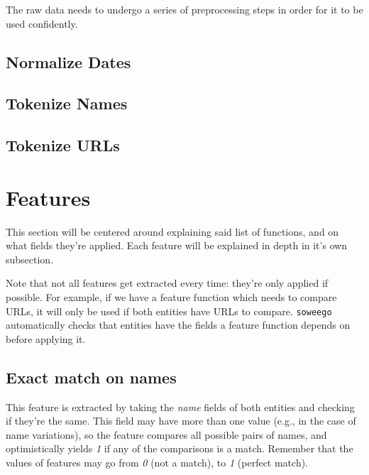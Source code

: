 \documentclass[epsfig,a4paper,11pt,titlepage,twoside,openany]{book}
\begin{document}

The raw data needs to undergo a series of preprocessing steps in order for it to be used confidently.



\subsection{Normalize Dates}
\label{sec:data-preprocessiong-date-normalization}

\subsection{Tokenize Names}
\label{sec:data-preprocessiong-name-tokenization}

\subsection{Tokenize URLs}
\label{sec:data-preprocessiong-URL-tokenization}



\section{Features}
\label{sec:used-features}

This section will be centered around explaining said list of functions, and on what fields they're applied. Each feature will be explained in depth in it's own subsection.

Note that not all features get extracted every time: they're only applied if possible. For example, if we have a feature function which needs to compare URLs, it will only be used if both entities have URLs to compare. \texttt{soweego} automatically checks that entities have the fields a feature function depends on before applying it.


\subsection{Exact match on names}
\label{sec:feature-exact-match-names}

This feature is extracted by taking the \textit{name} fields of both entities and checking if they're the same. This field may have more than one value (e.g., in the case of name variations), so the feature compares all possible pairs of names, and optimistically yields \textit{1} if any of the comparisons is a match. Remember that the values of features may go from \textit{0} (not a match), to \textit{1} (perfect match). 
\end{document}
